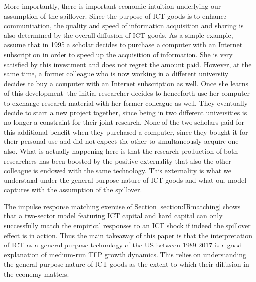 \documentclass[12pt]{article}
\begin{document}
More importantly, there is important economic intuition underlying our assumption of the spillover. Since the purpose of ICT goods is to enhance communication, the quality and speed of information acquisition and sharing is also determined by the overall diffusion of ICT goods. As a simple example, assume that in 1995 a scholar decides to purchase a computer with an Internet subscription in order to speed up the acquisition of information. She is very satisfied by this investment and does not regret the amount paid. However, at the same time, a former colleague who is now working in a different university decides to buy a computer with an Internet subscription as well. Once she learns of this development, the initial researcher decides to henceforth use her computer to exchange research material with her former colleague as well. They eventually decide to start a new project together, since being in two different universities is no longer a constraint for their joint research. None of the two scholars paid for this additional benefit when they purchased a computer, since they bought it for their personal use and did not expect the other to simultaneously acquire one also. What is actually happening here is that the research production of both researchers has been boosted by the positive externality that also the other colleague is endowed with the same technology. This externality is what we understand under the general-purpose nature of ICT goods and what our model captures with the assumption of the spillover.

The impulse response matching exercise of Section \ref{section:IRmatching} shows that a two-sector model featuring ICT capital and hard capital can only successfully match the empirical responses to an ICT shock if indeed the spillover effect is in action. Thus the main takeaway of this paper is that the interpretation of ICT as a general-purpose technology of the US between 1989-2017 is a good explanation of medium-run TFP growth dynamics. This relies on understanding the general-purpose nature of ICT goods as the extent to which their diffusion in the economy matters. 

\end{document}
